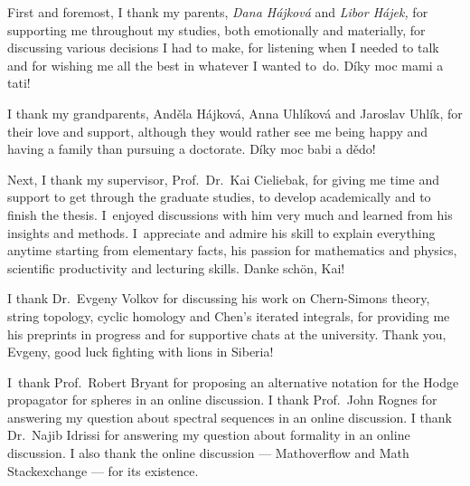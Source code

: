 \documentclass[\MainFolder/Text.tex]{subfiles}
\begin{document}

First and foremost, I thank my parents, \emph{Dana H\'ajkov\'a} and \emph{Libor H\'ajek,} for supporting me throughout my studies, both emotionally and materially, for discussing various decisions I had to make, for listening when I needed to talk and for wishing me all the best in whatever I wanted to~do.
D\'iky moc mami a tati!

I thank my grandparents,  And\v{e}la H\'ajkov\'a, Anna Uhl\'ikov\'a and Jaroslav Uhl\'ik, for their love and support, although they would rather see me being happy and having a family than pursuing a doctorate. D\'iky moc babi a d\v{e}do! 

Next, I thank my supervisor, Prof.~Dr.~Kai Cieliebak, for giving me time and support to get through the graduate studies, to develop academically and to finish the thesis. I~enjoyed discussions with him very much and learned from his insights and methods. I~appreciate and admire his skill to explain everything anytime starting from elementary facts, his passion for mathematics and physics, scientific productivity and lecturing skills. Danke sch\"on, Kai!



I thank Dr.~Evgeny Volkov for discussing his work on Chern-Simons theory, string topology, cyclic homology and Chen's iterated integrals, for providing me his preprints in progress and for supportive chats at the university. Thank you, Evgeny, good luck fighting with lions in Siberia!

I~thank Prof.~Robert Bryant for proposing an alternative notation for the Hodge propagator for spheres in an online discussion. I thank Prof.~John Rognes for answering my question about spectral sequences in an online discussion. I thank Dr.~Najib Idrissi for answering my question about formality in an online discussion. I also thank the online discussion --- Mathoverflow and Math Stackexchange --- for its existence.
\end{document}
